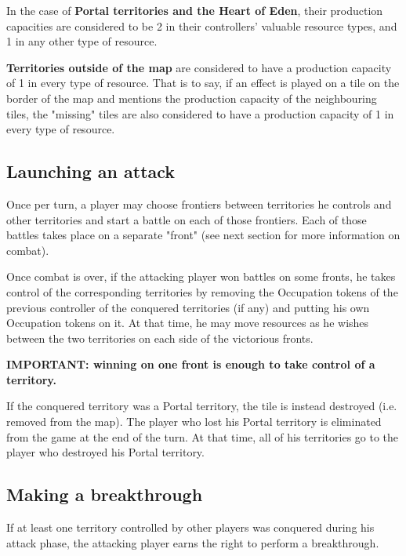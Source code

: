 \documentclass[a4paper]{article}
\begin{document}
      In the case of \textbf{Portal territories and the Heart of Eden},
      their production capacities are considered to be 2 in their controllers'
      valuable resource types, and 1 in any other type of resource.
    
      \textbf{Territories outside of the map} are considered to have a
      production capacity of 1 in every type of resource.
      That is to say, if an effect is played on a tile on the border
      of the map and mentions the production capacity of the neighbouring tiles,
      the "missing" tiles are also considered to have a production capacity of
      1 in every type of resource.


\newpage
\subsection{Launching an attack}

    Once per turn, a player may choose frontiers between territories he controls and other
    territories and start a battle on each of those frontiers.
    Each of those battles takes place on a separate "front"
    (see next section for more information on combat).

    Once combat is over, if the attacking player won battles on some fronts,
    he takes control of the corresponding territories by removing the Occupation tokens of
    the previous controller of the conquered territories (if any) and putting his own
    Occupation tokens on it.
    At that time, he may move resources as he wishes between the two territories on each
    side of the victorious fronts.
    
    \hspace{-2em} \textbf{
    IMPORTANT: winning on one front is enough to take control of a territory.
    }

    If the conquered territory was a Portal territory, the tile is instead destroyed
    (i.e. removed from the map).
    The player who lost his Portal territory is eliminated from the game at the end
    of the turn. At that time, all of his territories go to the player who destroyed
    his Portal territory.


\subsection{Making a breakthrough}

    If at least one territory controlled by other players was conquered during his attack
    phase, the attacking player earns the right to perform a breakthrough.
\end{document}
